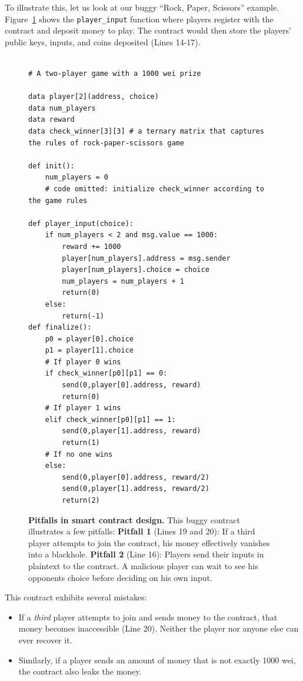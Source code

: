 \documentclass{llncs}
\begin{document}
To illustrate this, let us look at our buggy
``Rock, Paper, Scissors'' example.
Figure~\ref{fig:moneyleaks}
shows the {\tt player\_input} function
where players register with the contract and  
deposit money to play.
The contract would then store the players'
public keys, inputs,
and coins deposited (Lines 14-17).
%
\begin{figure}
\begin{mdframed}
\begin{verbatim}

# A two-player game with a 1000 wei prize

data player[2](address, choice)
data num_players
data reward
data check_winner[3][3] # a ternary matrix that captures the rules of rock-paper-scissors game

def init():
	num_players = 0
	# code omitted: initialize check_winner according to the game rules
	
def player_input(choice):
	if num_players < 2 and msg.value == 1000:
		reward += 1000
		player[num_players].address = msg.sender
		player[num_players].choice = choice
		num_players = num_players + 1
		return(0)
	else:
		return(-1)
def finalize():
	p0 = player[0].choice
	p1 = player[1].choice
	# If player 0 wins
	if check_winner[p0][p1] == 0:
		send(0,player[0].address, reward)
		return(0)
	# If player 1 wins
	elif check_winner[p0][p1] == 1:
		send(0,player[1].address, reward)
		return(1)
	# If no one wins
	else:
		send(0,player[0].address, reward/2)
		send(0,player[1].address, reward/2)
		return(2)
\end{verbatim}
\end{mdframed}
\caption{
\label{fig:moneyleaks}
{\bf Pitfalls in smart contract design.} This buggy contract illustrates a few pitfalls: \newline
{\bf Pitfall 1} (Lines 19 and 20): If a third player
attempts to join the contract, his
money effectively vanishes into a blackhole. \newline
{\bf Pitfall 2} (Line 16): Players send their inputs 
in plaintext to the contract. A malicious player 
can wait to see his opponents choice before deciding on his own input.
}
\end{figure}
%
%
This contract exhibits several mistakes:
\begin{itemize}[leftmargin=5mm]
\item
If a \emph{third} player attempts to join and sends money to the contract,
that money becomes inaccessible (Line 20). Neither the player nor anyone else can ever recover it.
\item
Similarly, if a player sends an amount of money that is not
exactly 1000 wei,
the contract also leaks the money.
\end{itemize}
\end{document}

